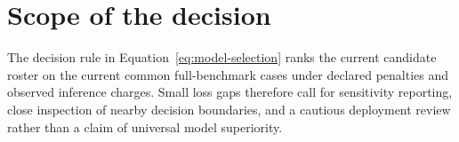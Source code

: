 \section{Scope of the decision}

The decision rule in Equation~\eqref{eq:model-selection} ranks the current candidate roster on the current common full-benchmark cases under declared penalties and observed inference charges. Small loss gaps therefore call for sensitivity reporting, close inspection of nearby decision boundaries, and a cautious deployment review rather than a claim of universal model superiority.
